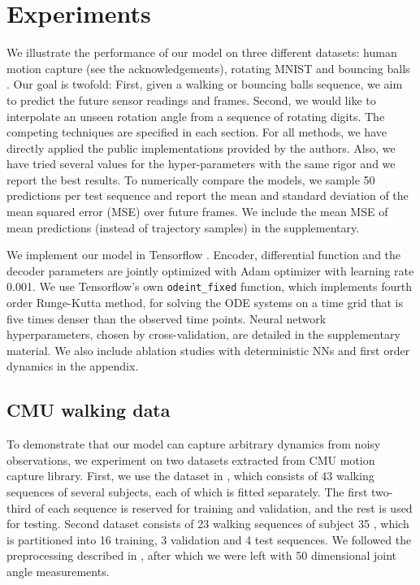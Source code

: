 \documentclass{article}
\newcommand{\0}{\mathbf{0}}
\begin{document}
\section{Experiments}
We illustrate the performance of our model on three different datasets: human motion capture (see the acknowledgements), rotating MNIST \citep{casale2018gaussian} and bouncing balls \citep{sutskever2009recurrent}. Our goal is twofold: First, given a walking or bouncing balls sequence, we aim to predict the future sensor readings and frames. Second, we would like to interpolate an unseen rotation angle from a sequence of rotating digits. The competing techniques are specified in each section. For all methods, we have directly applied the public implementations provided by the authors. Also, we have tried several values for the hyper-parameters with the same rigor and we report the best results. To numerically compare the models, we sample 50 predictions per test sequence and report the mean and standard deviation of the mean squared error (MSE) over future frames. We include the mean MSE of mean predictions (instead of trajectory samples) in the supplementary.

We implement our model in Tensorflow \citep{abadi2016}. Encoder, differential function and the decoder parameters are jointly optimized with Adam optimizer \citep{kingma2014adam} with learning rate 0.001. We use Tensorflow's own \texttt{odeint\_fixed} function, which implements fourth order Runge-Kutta method, for solving the ODE systems on a time grid that is five times denser than the observed time points. Neural network hyperparameters, chosen by cross-validation, are detailed in the supplementary material. We also include ablation studies with deterministic NNs and first order dynamics in the appendix.



\subsection{CMU walking data}
To demonstrate that our model can capture arbitrary dynamics from noisy observations, we experiment on two datasets extracted from CMU motion capture library. First, we use the dataset in \cite{heinonen18a}, which consists of 43 walking sequences of several subjects, each of which is fitted separately. The first two-third of each sequence is reserved for training and validation, and the rest is used for testing. Second dataset consists of 23 walking sequences of subject 35 \citep{gan2015deep}, which is partitioned into 16 training, 3 validation and 4 test sequences. We followed the preprocessing described in \citet{wang2008gaussian}, after which we were left with 50 dimensional joint angle measurements. 
\end{document}
